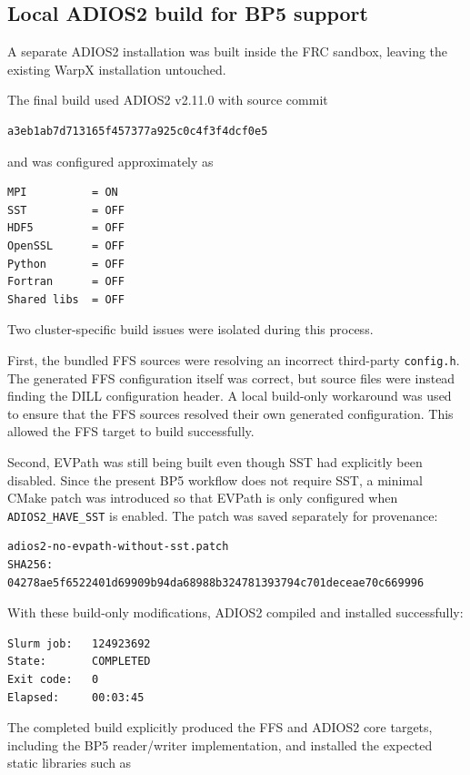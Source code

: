 \documentclass[11pt,a4paper]{article}
\begin{document}
\subsection{Local ADIOS2 build for BP5 support}

A separate ADIOS2 installation was built inside the FRC sandbox, leaving the
existing WarpX installation untouched.

The final build used ADIOS2 v2.11.0 with source commit
\begin{verbatim}
a3eb1ab7d713165f457377a925c0c4f3f4dcf0e5
\end{verbatim}

and was configured approximately as
\begin{verbatim}
MPI          = ON
SST          = OFF
HDF5         = OFF
OpenSSL      = OFF
Python       = OFF
Fortran      = OFF
Shared libs  = OFF
\end{verbatim}

Two cluster-specific build issues were isolated during this process.

First, the bundled FFS sources were resolving an incorrect third-party
\texttt{config.h}. The generated FFS configuration itself was correct, but
source files were instead finding the DILL configuration header. A local
build-only workaround was used to ensure that the FFS sources resolved their
own generated configuration. This allowed the FFS target to build
successfully.

Second, EVPath was still being built even though SST had explicitly been
disabled. Since the present BP5 workflow does not require SST, a minimal
CMake patch was introduced so that EVPath is only configured when
\texttt{ADIOS2\_HAVE\_SST} is enabled. The patch was saved separately for
provenance:

\begin{verbatim}
adios2-no-evpath-without-sst.patch
SHA256:
04278ae5f6522401d69909b94da68988b324781393794c701deceae70c669996
\end{verbatim}

With these build-only modifications, ADIOS2 compiled and installed
successfully:

\begin{verbatim}
Slurm job:   124923692
State:       COMPLETED
Exit code:   0
Elapsed:     00:03:45
\end{verbatim}

The completed build explicitly produced the FFS and ADIOS2 core targets,
including the BP5 reader/writer implementation, and installed the expected
static libraries such as
\end{document}
